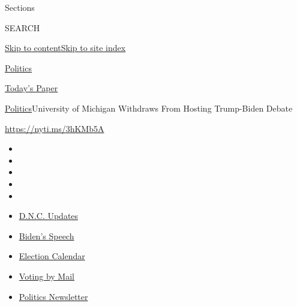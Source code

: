 Sections

SEARCH

\protect\hyperlink{site-content}{Skip to
content}\protect\hyperlink{site-index}{Skip to site index}

\href{https://www.nytimes3xbfgragh.onion/section/politics}{Politics}

\href{https://myaccount.nytimes3xbfgragh.onion/auth/login?response_type=cookie\&client_id=vi}{}

\href{https://www.nytimes3xbfgragh.onion/section/todayspaper}{Today's
Paper}

\href{/section/politics}{Politics}\textbar{}University of Michigan
Withdraws From Hosting Trump-Biden Debate

\url{https://nyti.ms/3hKMb5A}

\begin{itemize}
\item
\item
\item
\item
\item
\end{itemize}

\begin{itemize}
\item
  \href{https://www.nytimes3xbfgragh.onion/live/2020/08/20/us/dnc-convention-election?action=click\&pgtype=Article\&state=default\&region=TOP_BANNER\&context=storylines_menu}{D.N.C.
  Updates}
\item
  \href{https://www.nytimes3xbfgragh.onion/2020/08/20/us/politics/biden-presidential-nomination-dnc.html?action=click\&pgtype=Article\&state=default\&region=TOP_BANNER\&context=storylines_menu}{Biden's
  Speech}
\item
  \href{https://www.nytimes3xbfgragh.onion/interactive/2019/us/elections/2020-presidential-election-calendar.html?action=click\&pgtype=Article\&state=default\&region=TOP_BANNER\&context=storylines_menu}{Election
  Calendar}
\item
  \href{https://www.nytimes3xbfgragh.onion/interactive/2020/08/11/us/politics/vote-by-mail-us-states.html?action=click\&pgtype=Article\&state=default\&region=TOP_BANNER\&context=storylines_menu}{Voting
  by Mail}
\item
  \href{https://www.nytimes3xbfgragh.onion/newsletters/politics?action=click\&pgtype=Article\&state=default\&region=TOP_BANNER\&context=storylines_menu}{Politics
  Newsletter}
\end{itemize}

